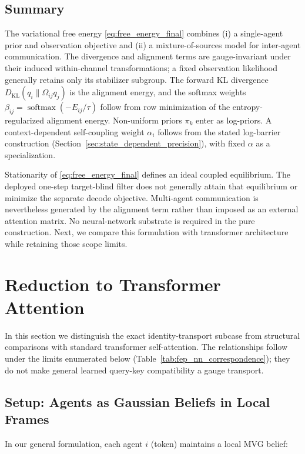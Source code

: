 \documentclass[twoside,11pt]{article}
\begin{document}
\subsection{Summary}

The variational free energy \eqref{eq:free_energy_final} combines (i) a single-agent prior and observation objective and (ii) a mixture-of-sources model for inter-agent communication. The divergence and alignment terms are gauge-invariant under their induced within-channel transformations; a fixed observation likelihood generally retains only its stabilizer subgroup. The forward KL divergence $D_{\mathrm{KL}}(q_i \| \Omega_{ij}q_j)$ is the alignment energy, and the softmax weights $\beta_{ij} = \operatorname{softmax}(-E_{ij}/\tau)$ follow from row minimization of the entropy-regularized alignment energy. Non-uniform priors $\pi_k$ enter as log-priors. A context-dependent self-coupling weight $\alpha_i$ follows from the stated log-barrier construction (Section~\ref{sec:state_dependent_precision}), with fixed $\alpha$ as a specialization.

Stationarity of \eqref{eq:free_energy_final} defines an ideal coupled equilibrium. The deployed one-step target-blind filter does not generally attain that equilibrium or minimize the separate decode objective. Multi-agent communication is nevertheless generated by the alignment term rather than imposed as an external attention matrix. No neural-network substrate is required in the pure construction. Next, we compare this formulation with transformer architecture while retaining those scope limits.

\section{Reduction to Transformer Attention}

In this section we distinguish the exact identity-transport subcase from structural comparisons with standard transformer self-attention. The relationships follow under the limits enumerated below (Table~\ref{tab:fep_nn_correspondence}); they do not make general learned query-key compatibility a gauge transport.

\subsection{Setup: Agents as Gaussian Beliefs in Local Frames}

In our general formulation, each agent $i$ (token) maintains a local MVG belief:
\end{document}

